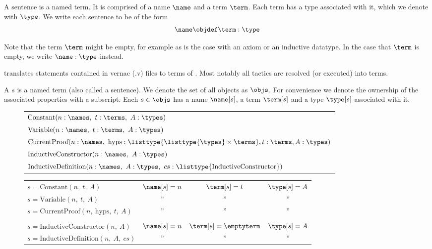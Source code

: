 \begin{definition}[sentence]
	A sentence is a named term. It is comprised of a name $\name$ and a term $\term$. Each term has a type associated with it, which we denote with $\type$.
	We write each sentence to be of the form
	\[\name \objdef \term : \type\]
\end{definition}

Note that the term $\term$ might be empty, for example as is the case with an axiom or an inductive datatype.
In the case that $\term$ is empty, we write $\name : \type$ instead.

\coq translates \gallina statements contained in \coq vernac (.v) files to terms of \pcic.
Most notably all tactics are resolved (or executed) into terms.

\begin{definition}[{\coqobj[s]}]
	A \coqobj $s$ is a named \pcic term (also called a sentence).
	We denote the set of all \coq objects as $\objs$.
	For convenience we denote the ownership of the associated properties with a subscript.
	Each \coqobj $s \in \objs$ has a name $\name[s]$,
	a term $\term[s]$ and a type $\type[s]$ associated with it.

	\begin{figure}[H]
		\centering
		\begin{tabular}{l}
			$\text{Constant}(n:\names,~ t:\terms,~ A:\types)$ \\
			$\text{Variable}(n:\names,~ t:\terms,~ A:\types)$ \\
			$\text{CurrentProof}(n:\names,~ \text{hyps}:\listtype{\listtype{\types} \times \terms}, t:\terms, A:\types)$ \\
			$\text{InductiveConstructor}(n:\names,~ A:\types)$ \\
			$\text{InductiveDefinition}(n:\names,~ A:\types,~ cs:\listtype{\text{InductiveConstructor}})$
		\end{tabular}
	\end{figure}

	\begin{figure}[H]
		\centering
		\begin{tabular}{lccc}
			$s = \text{Constant}(n,~ t,~ A)$ & $\name[s] = n$ & $\term[s] = t$ & $\type[s] = A$ \\
			$s = \text{Variable}(n,~ t,~ A)$ & '' & '' & '' \\
			$s = \text{CurrentProof}(n,~ \text{hyps},~ t,~ A)$ & '' & '' & '' \\
			 & & & \\
			$s = \text{InductiveConstructor}(n,~ A)$ & $\name[s] = n$ & $\term[s] = \emptyterm$ & $\type[s] = A$ \\
			$s = \text{InductiveDefinition}(n,~ A,~ cs)$ & '' & '' & ''
		\end{tabular}
	\end{figure}
\end{definition}

